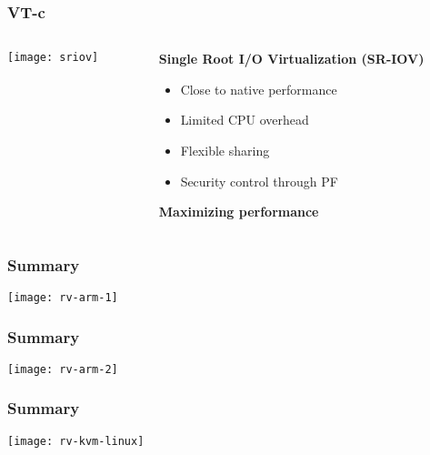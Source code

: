 \begin{frame}[plain]
	\frametitle{VT-c}
	
	
	\begin{columns}
		
		\begin{column}{.5\textwidth}
			
			\texttt{[image: sriov]}
			
		\end{column}
		
		\begin{column}{.5\textwidth}
			
			\textbf{Single Root I/O Virtualization (SR-IOV)}
			
			
			
			\begin{itemize}
				\item Close to native performance  
				\item Limited CPU overhead
				\item Flexible sharing
				\item Security control through PF
			\end{itemize} 
			
			\textbf{Maximizing performance}
			
		\end{column}
		
		
	\end{columns}
	
\end{frame}
\begin{frame}[plain]
	\frametitle{Summary}
	\centering
	
\texttt{[image: rv-arm-1]}
	
\end{frame}

\begin{frame}[plain]
	\frametitle{Summary}
	\centering
	
	\texttt{[image: rv-arm-2]}
	
\end{frame}


\begin{frame}[plain]
	\frametitle{Summary}
	\centering
	
	\texttt{[image: rv-kvm-linux]}
	
\end{frame}


